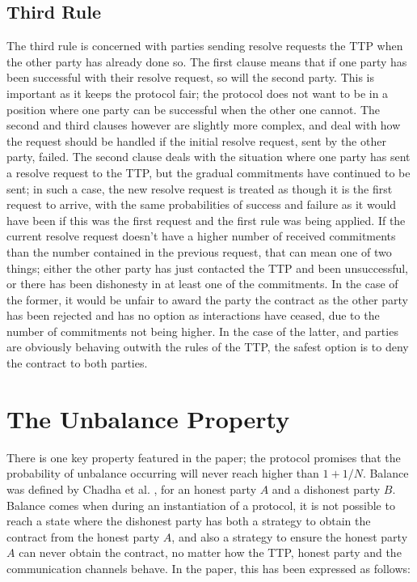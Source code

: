 \documentclass{l4proj}
\begin{document}
\subsection{Third Rule}
The third rule is concerned with parties sending resolve requests the TTP when the other party has already done so. The first clause means that if one party has been successful with their resolve request, so will the second party. This is important as it keeps the protocol fair; the protocol does not want to be in a position where one party can be successful when the other one cannot. The second and third clauses however are slightly more complex, and deal with how the request should be handled if the initial resolve request, sent by the other party, failed. The second clause deals with the situation where one party has sent a resolve request to the TTP, but the gradual commitments have continued to be sent; in such a case, the new resolve request is treated as though it is the first request to arrive, with the same probabilities of success and failure as it would have been if this was the first request and the first rule was being applied.
If the current resolve request doesn't have a higher number of received commitments than the number contained in the previous request, that can mean one of two things; either the other party has just contacted the TTP and been unsuccessful, or there has been dishonesty in at least one of the commitments. In the case of the former, it would be unfair to award the party the contract as the other party has been rejected and has no option as interactions have ceased, due to the number of commitments not being higher. In the case of the latter, and parties are obviously behaving outwith the rules of the TTP, the safest option is to deny the contract to both parties.

\section{The Unbalance Property}


There is one key property featured in the paper; the protocol promises that the probability of unbalance occurring will never reach higher than $1+1/N$.
Balance was defined by Chadha et al. \cite{chadha2001inductive}, for an honest party $A$ and a dishonest party $B$. Balance comes when during an instantiation of a protocol, it is not possible to reach a state where the dishonest party has both a strategy to obtain the contract from the honest party $A$, and also a strategy to ensure the honest party $A$ can never obtain the contract, no matter how the TTP, honest party and the communication channels behave. In the paper,  this has been expressed as follows:\\
\end{document}
